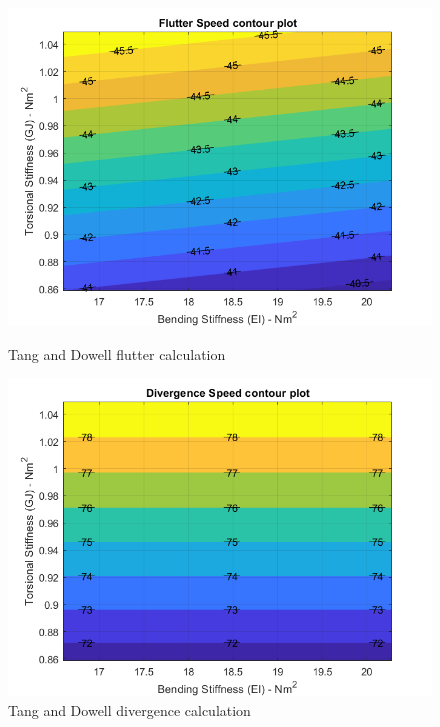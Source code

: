 \documentclass[11pt]{article}
\begin{document}
\begin{figure}[!hbt]
    \begin{minipage}{.5\textwidth}
    \centering
    \includegraphics[width = \textwidth]{figures/flutter.png}
    \caption{Tang and Dowell flutter calculation}
    \label{fig:TandD-flutter}
    \end{minipage}%
    \begin{minipage}{.5\textwidth}
    \centering
    \includegraphics[width = \textwidth]{figures/divergence.png}
    \caption{Tang and Dowell divergence calculation}
    \label{fig:TandD-div}
    \end{minipage}
\end{figure}
\end{document}
